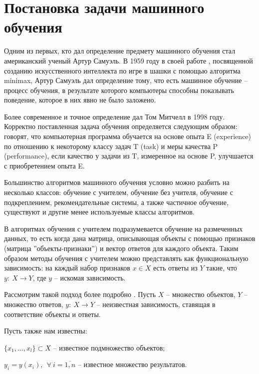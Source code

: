 \section{Постановка задачи машинного обучения}

Одним из первых, кто дал определение предмету машинного обучения стал американский ученый Артур Самуэль. В 1959 году в своей работе \cite{Samuel:ML}, посвященной созданию искусственного интеллекта по игре в шашки с помощью алгоритма minimax, Артур Самуэль дал определение тому, что есть машинное обучение -- процесс обучения, в результате которого компьютеры способны показывать поведение, которое в них явно не было заложено.

Более современное и точное определение дал Том Митчелл в 1998 году. Корректно поставленная задача обучения определяется следующим образом: говорят, что компьютерная программа обучается на основе опыта E (experience) по отношению к некоторому классу задач T (task) и меры качества P (performance), если качество у задачи из T, измеренное на основе P, улучшается с приобретением опыта E.

Большинство алгоритмов машинного обучения условно можно разбить на несколько классов: обучение с учителем, обучение без учителя, обучение с подкреплением, рекомендательные системы, а также частичное обучение, существуют и другие менее используемые классы алгоритмов.

В алгоритмах обучения с учителем подразумевается обучение на размеченных данных, то есть когда дана матрица, описывающая объекты с помощью признаков (матрица ''объекты-признаки'') и вектор ответов для каждого объекта. Таким образом методы обучения с учителем можно представлять как функциональную зависимость: на каждый набор признаков $x \in X$ есть ответы из $Y$ такие, что $y:~X \rightarrow Y$, где $y$ -- искомая зависимость.

Рассмотрим такой подход более подробно \cite{coursera:voroncov}. Пусть $X$ -- множество объектов, $Y$ -- множество ответов, $y:~X \rightarrow Y$ -- неизвестная зависимость, ставящая в соответствие объекты и ответы.

Пусть также нам известны:\\
\begin{description}[font=$\bullet$]
    \item $\{ x_1, \dots, x_l \} \subset X $ -- известное подмножество объектов;
    \item $y_i = y(x_i),~~\forall~i=\overline{1,n}$ -- известное множество результатов.
\end{description}

